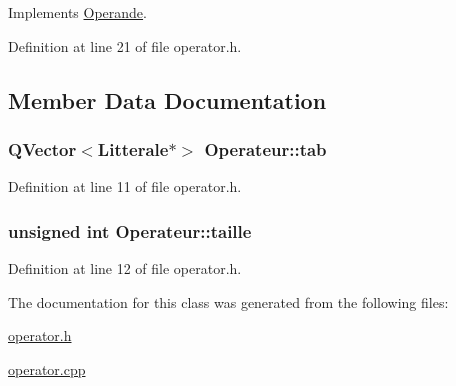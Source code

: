 Implements \hyperlink{class_operande_a2acae8f59199e93850b3fdb13eba1672}{Operande}.



Definition at line 21 of file operator.\+h.



\subsection{Member Data Documentation}
\subsubsection[{\texorpdfstring{tab}{tab}}]{\setlength{\rightskip}{0pt plus 5cm}Q\+Vector$<${\bf Litterale}$\ast$$>$ Operateur\+::tab\hspace{0.3cm}{\ttfamily [protected]}}\hypertarget{class_operateur_a8f8f737f9d972ac60d1f0d8700cd3857}{}\label{class_operateur_a8f8f737f9d972ac60d1f0d8700cd3857}


Definition at line 11 of file operator.\+h.

\subsubsection[{\texorpdfstring{taille}{taille}}]{\setlength{\rightskip}{0pt plus 5cm}unsigned int Operateur\+::taille\hspace{0.3cm}{\ttfamily [protected]}}\hypertarget{class_operateur_a616ac1808bc641e898d0ed97f770ffaf}{}\label{class_operateur_a616ac1808bc641e898d0ed97f770ffaf}


Definition at line 12 of file operator.\+h.



The documentation for this class was generated from the following files\+:\begin{DoxyCompactItemize}
\item 
\hyperlink{operator_8h}{operator.\+h}\item 
\hyperlink{operator_8cpp}{operator.\+cpp}\end{DoxyCompactItemize}
